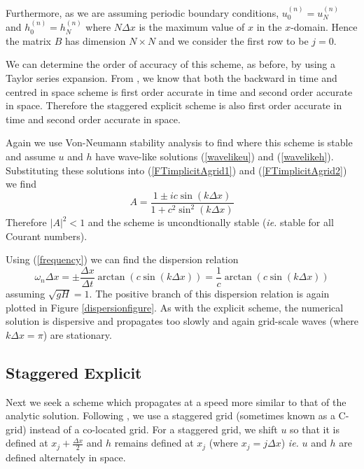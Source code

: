 \documentclass[a4paper, 10.8pt, notitlepage]{article}
\begin{document}
Furthermore, as we are assuming periodic boundary conditions, $u_{0}^{(n)} = u_{N}^{(n)}$ and $h_{0}^{(n)} = h_{N}^{(n)}$ where $N\Delta x$ is the maximum value of $x$ in the $x$-domain. Hence the matrix $B$ has dimension $N \times N$ and we consider the first row to be $j = 0$. 

We can determine the order of accuracy of this scheme, as before, by using a Taylor series expansion.  From \cite{MPE textbook}, we know that both the backward in time and centred in space scheme is first order accurate in time and second order accurate in space. Therefore the staggered explicit scheme is also first order accurate in time and second order accurate in space.

Again we use Von-Neumann stability analysis to find where this scheme is stable and assume $u$ and $h$ have wave-like solutions (\ref{wavelikeu}) and (\ref{wavelikeh}). Substituting these solutions into (\ref{FTimplicitAgrid1}) and (\ref{FTimplicitAgrid2}) we find
\begin{equation}
A = \frac{1 \pm i c\sin(k\Delta x)}{1 + c^{2}\sin^{2}(k\Delta x)}
\end{equation}
Therefore $\lvert A \rvert ^{2} < 1$ and the scheme is uncondtionally stable (\textit{ie.} stable for all Courant numbers). 

Using (\ref{frequency}) we can find the dispersion relation
\begin{equation}
\omega_{n} \Delta x = \pm\frac{\Delta x}{\Delta t} \arctan(c\sin(k\Delta x)) = \frac{1}{c}  \arctan(c\sin(k\Delta x))
\end{equation}
assuming $\sqrt{gH} = 1$. The positive branch of this dispersion relation is again plotted in Figure \ref{dispersionfigure}. As with the explicit scheme, the numerical solution is dispersive and propagates too slowly and again grid-scale waves (where $k\Delta x = \pi$) are stationary. 

\subsection{Staggered Explicit}
Next we seek a scheme which propagates at a speed more similar to that of the analytic solution. Following \cite{MPE textbook}, we use a staggered grid (sometimes known as a C-grid) instead of a co-located grid. For a staggered grid, we shift $u$ so that it is defined at $x_{j} + \frac{\Delta x}{2}$ and $h$ remains defined at $x_{j}$ (where $x_{j} = j \Delta x$) \textit{ie.} $u$ and $h$ are defined alternately in space.
\end{document}
